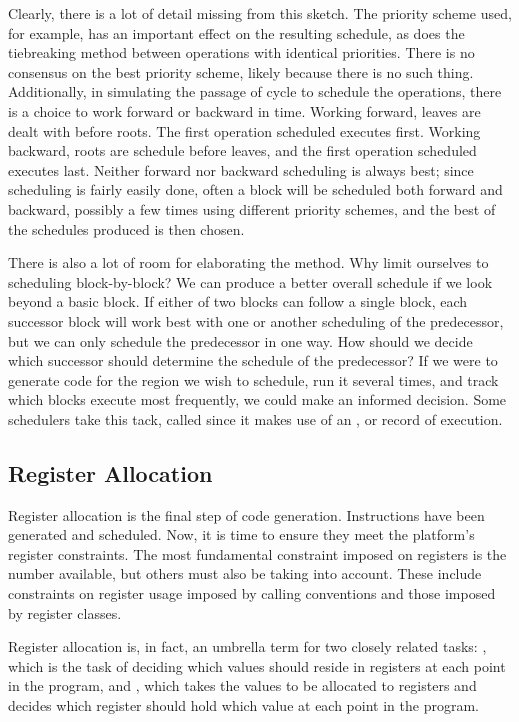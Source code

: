 Clearly, there is a lot of detail missing from this sketch. The priority scheme used, for example, has an important effect on the resulting schedule, as does the tiebreaking method between operations with identical priorities. There is no consensus on the best priority scheme, likely because there is no such thing. Additionally, in simulating the passage of cycle to schedule the operations, there is a choice to work forward or backward in time. Working forward, leaves are dealt with before roots. The first operation scheduled executes first. Working backward, roots are schedule before leaves, and the first operation scheduled executes last. Neither forward nor backward scheduling is always best; since scheduling is fairly easily done, often a block will be scheduled both forward and backward, possibly a few times using different priority schemes, and the best of the schedules produced is then chosen.

There is also a lot of room for elaborating the method. Why limit ourselves to scheduling block-by-block? We can produce a better overall schedule if we look beyond a basic block. If either of two blocks can follow a single block, each successor block will work best with one or another scheduling of the predecessor, but we can only schedule the predecessor in one way. How should we decide which successor should determine the schedule of the predecessor? If we were to generate code for the region we wish to schedule, run it several times, and track which blocks execute most frequently, we could make an informed decision. Some schedulers take this tack, called  since it makes use of an , or record of execution.%

\subsection{Register Allocation}
Register allocation is the final step of code generation. Instructions have been generated and scheduled. Now, it is time to ensure they meet the platform's register constraints. The most fundamental constraint imposed on registers is the number available, but others must also be taking into account. These include constraints on register usage imposed by calling conventions and those imposed by register classes.

Register allocation is, in fact, an umbrella term for two closely related tasks: , which is the task of deciding which values should reside in registers at each point in the program, and , which takes the values to be allocated to registers and decides which register should hold which value at each point in the program.

